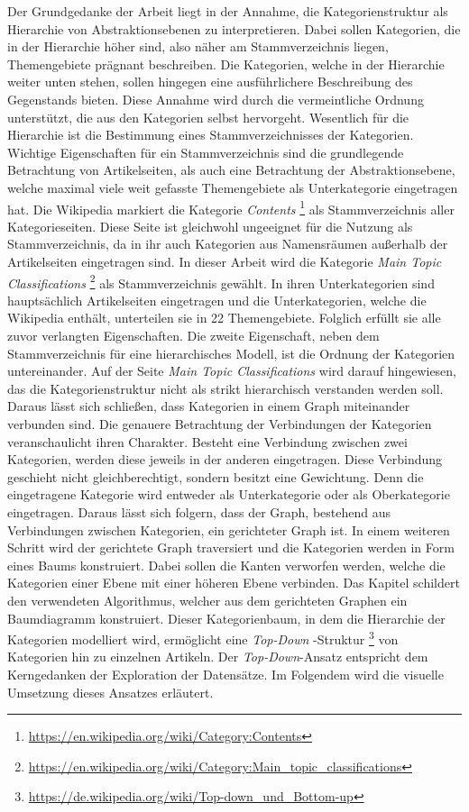 Der Grundgedanke der Arbeit liegt in der Annahme, die Kategorienstruktur als Hierarchie von Abstraktionsebenen zu interpretieren.
Dabei sollen Kategorien, die in der Hierarchie höher sind, also näher am Stammverzeichnis liegen, Themengebiete prägnant beschreiben. Die Kategorien, welche in der Hierarchie weiter unten stehen, sollen hingegen eine ausführlichere Beschreibung des Gegenstands bieten.
Diese Annahme wird durch die vermeintliche Ordnung unterstützt, die aus den Kategorien selbst hervorgeht.
Wesentlich für die Hierarchie ist die Bestimmung eines Stammverzeichnisses der Kategorien.
Wichtige Eigenschaften für ein Stammverzeichnis sind die grundlegende Betrachtung von Artikelseiten, als auch eine Betrachtung der Abstraktionsebene, welche maximal viele weit gefasste Themengebiete als Unterkategorie eingetragen hat.
Die Wikipedia markiert die Kategorie \emph{Contents} \footnote{\url{https://en.wikipedia.org/wiki/Category:Contents}} als Stammverzeichnis aller Kategorieseiten. Diese Seite ist gleichwohl ungeeignet für die Nutzung als Stammverzeichnis, da in ihr auch Kategorien aus Namensräumen außerhalb der Artikelseiten eingetragen sind.
In dieser Arbeit wird die Kategorie \emph{Main Topic Classifications} \footnote{\url{https://en.wikipedia.org/wiki/Category:Main_topic_classifications}} als Stammverzeichnis gewählt.
In ihren Unterkategorien sind hauptsächlich Artikelseiten eingetragen und die Unterkategorien, welche die Wikipedia enthält, unterteilen sie in 22 Themengebiete.
Folglich erfüllt sie alle zuvor verlangten Eigenschaften.
Die zweite Eigenschaft, neben dem Stammverzeichnis für eine hierarchisches Modell, ist die Ordnung der Kategorien untereinander.
Auf der Seite \emph{Main Topic Classifications} wird darauf hingewiesen, das die Kategorienstruktur nicht als strikt hierarchisch verstanden werden soll. Daraus lässt sich schließen, dass Kategorien in einem Graph miteinander verbunden sind.
Die genauere Betrachtung der Verbindungen der Kategorien veranschaulicht ihren Charakter.
Besteht eine Verbindung zwischen zwei Kategorien, werden diese jeweils in der anderen eingetragen.
Diese Verbindung geschieht nicht gleichberechtigt, sondern besitzt eine Gewichtung. Denn die eingetragene Kategorie wird entweder als Unterkategorie oder als Oberkategorie eingetragen.
Daraus lässt sich folgern, dass der Graph, bestehend aus Verbindungen zwischen Kategorien, ein gerichteter Graph ist.
In einem weiteren Schritt wird der gerichtete Graph traversiert und die Kategorien werden in Form eines Baums konstruiert. Dabei sollen die Kanten verworfen werden, welche die Kategorien einer Ebene mit einer höheren Ebene verbinden.
Das Kapitel  schildert den verwendeten Algorithmus, welcher aus dem gerichteten Graphen ein Baumdiagramm konstruiert.
Dieser Kategorienbaum, in dem die Hierarchie der Kategorien modelliert wird, ermöglicht eine \emph{Top-Down} -Struktur \footnote{\url{https://de.wikipedia.org/wiki/Top-down_und_Bottom-up}} von Kategorien hin zu einzelnen Artikeln.
Der \emph{Top-Down}-Ansatz entspricht dem Kerngedanken der Exploration der Datensätze. Im Folgendem wird die visuelle Umsetzung dieses Ansatzes erläutert.

